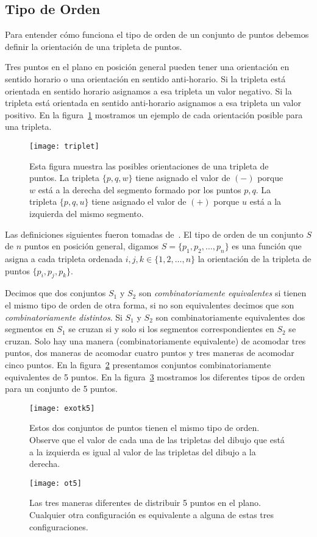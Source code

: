 \subsection{Tipo de Orden}

Para entender cómo funciona el tipo de orden de un conjunto de puntos
debemos definir la orientación de una tripleta de puntos.

Tres puntos en el plano en posición general pueden tener una orientación en sentido horario
o una orientación en sentido anti-horario. Si la tripleta está orientada en sentido horario
asignamos a esa tripleta un valor negativo. Si la tripleta está orientada en sentido anti-horario
asignamos a esa tripleta un valor positivo. En la figura~\ref{fig:triplet} mostramos un ejemplo de
cada orientación posible para una tripleta.
\begin{figure}[htpb]
  \centering
  \texttt{[image: triplet]}
  \caption{Esta figura muestra las posibles orientaciones de una tripleta de puntos. La tripleta $\{p,q,w\}$ tiene
  asignado el valor de $(-)$ porque $w$ está a la derecha del segmento formado por los puntos $p,q$. La tripleta $\{p,q,u\}$ tiene
  asignado el valor de $(+)$  porque $u$ está a la izquierda del mismo segmento.}
  \label{fig:triplet}
\end{figure}

Las definiciones siguientes fueron tomadas de~\cite{Aichholzer2002}.
El tipo de orden de un conjunto $S$ de $n$ puntos en posición general, digamos
$S=\{p_1,p_2,\dots,p_n\}$ es una función que asigna a cada tripleta ordenada
$i,j,k \in \{1,2,\dots,n\}$ la orientación de la tripleta de puntos $\{p_i,p_j,p_k\}$.

Decimos que dos conjuntos $S_1$ y $S_2$ son \emph{combinatoriamente equivalentes} si
tienen el mismo tipo de orden de otra forma, si no son equivalentes decimos que son
\emph{combinatoriamente distintos}. Si $S_1$ y $S_2$ son combinatoriamente equivalentes
dos segmentos en $S_1$ se cruzan si y solo si los segmentos correspondientes en $S_2$
se cruzan. Solo hay una manera (combinatoriamente equivalente) de acomodar tres puntos,
dos maneras de acomodar cuatro puntos y tres maneras de acomodar cinco puntos.
En la figura~\ref{fig:exotk5} presentamos conjuntos
combinatoriamente equivalentes de 5 puntos. En la figura~\ref{fig:ot5}
mostramos los diferentes tipos de orden para un conjunto de 5 puntos.

\begin{figure}[htpb]
  \centering
  \texttt{[image: exotk5]}
  \caption{Estos dos conjuntos de puntos tienen el mismo tipo de orden.
  Observe que el valor de cada una de las tripletas del dibujo
  que está a la izquierda es igual al valor de las tripletas del
  dibujo a la derecha.}
  \label{fig:exotk5}
\end{figure}
\begin{figure}[htpb]
  \centering
  \texttt{[image: ot5]}
  \caption{Las tres maneras diferentes de distribuir 5 puntos en el plano. Cualquier
  otra configuración es equivalente a alguna de estas tres configuraciones.}
  \label{fig:ot5}
\end{figure}

